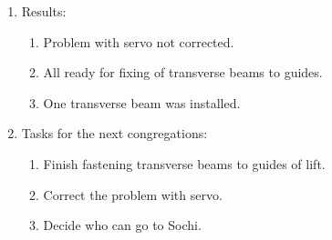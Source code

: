 \begin{enumerate}
\begin{enumerate}
    \end{enumerate}
    
	\item Results: 
	\begin{enumerate}
	  \item Problem with servo not corrected.
	  
      \item All ready for fixing of transverse beams to guides.
      
      \item One transverse beam was installed.
      
    \end{enumerate}
    
	\item Tasks for the next congregations:
	\begin{enumerate}
	  \item Finish fastening transverse beams to guides of lift.
	  
	  \item Correct the problem with servo.
	  
	  \item Decide who can go to Sochi.
	 
    \end{enumerate}     
\end{enumerate}
\fillpage
